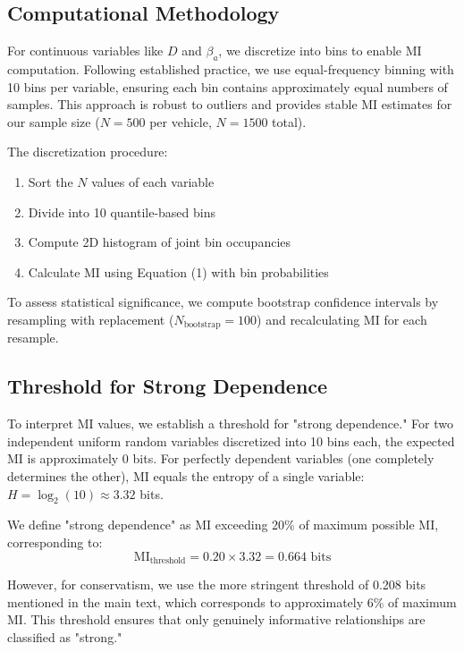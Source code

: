 \documentclass[11pt]{article}
\begin{document}
\subsection{Computational Methodology}

For continuous variables like $D$ and $\beta_a$, we discretize into bins to enable MI computation. Following established practice\cite{Kraskov2004}, we use equal-frequency binning with 10 bins per variable, ensuring each bin contains approximately equal numbers of samples. This approach is robust to outliers and provides stable MI estimates for our sample size ($N = 500$ per vehicle, $N = 1500$ total).

The discretization procedure:
\begin{enumerate}
\item Sort the $N$ values of each variable
\item Divide into 10 quantile-based bins
\item Compute 2D histogram of joint bin occupancies
\item Calculate MI using Equation (1) with bin probabilities
\end{enumerate}

To assess statistical significance, we compute bootstrap confidence intervals by resampling with replacement ($N_{\text{bootstrap}} = 100$) and recalculating MI for each resample.

\subsection{Threshold for Strong Dependence}

To interpret MI values, we establish a threshold for "strong dependence." For two independent uniform random variables discretized into 10 bins each, the expected MI is approximately 0 bits. For perfectly dependent variables (one completely determines the other), MI equals the entropy of a single variable: $H = \log_2(10) \approx 3.32$ bits.

We define "strong dependence" as MI exceeding 20\% of maximum possible MI, corresponding to:
\begin{equation}
\text{MI}_{\text{threshold}} = 0.20 \times 3.32 = 0.664 \text{ bits}
\end{equation}

However, for conservatism, we use the more stringent threshold of 0.208 bits mentioned in the main text, which corresponds to approximately 6\% of maximum MI. This threshold ensures that only genuinely informative relationships are classified as "strong."
\end{document}
